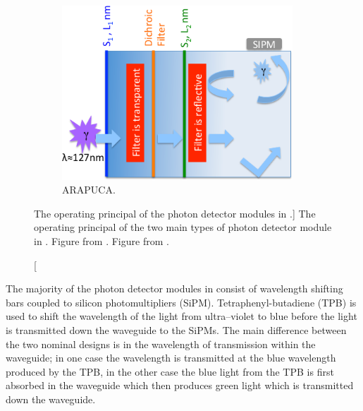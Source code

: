 \begin{figure}
\begin{subfigure}[b]{0.69\textwidth}
		\includegraphics[width=0.95\textwidth]{figures/pdsp_arapuca.png}
		\caption{ARAPUCA.}
		\label{fig:arapuca}
	\end{subfigure}

	\caption
	[The operating principal of the photon detector modules in \protodune{}.]
	{The operating principal of the two main types of photon detector module in 
	\protodune{}. Figure  from \cite{Abi:2017aow}. Figure 
	 from \cite{Machado:2016jqe}.}

	\label{fig:pdsp_pd}

\end{figure}

The majority of the photon detector modules in \protodune{} consist of 
wavelength shifting bars coupled to silicon photomultipliers (SiPM). 
Tetraphenyl-butadiene (TPB) is used to shift the wavelength of the light 
from ultra--violet to blue before the light is transmitted down the waveguide to
the SiPMs. The main difference between the two nominal designs is in the 
wavelength of transmission within the waveguide; in one case the wavelength is 
transmitted at the blue wavelength produced by the TPB, in the other case the 
blue light from the TPB is first absorbed in the waveguide which then produces 
green light which is transmitted down the waveguide.

